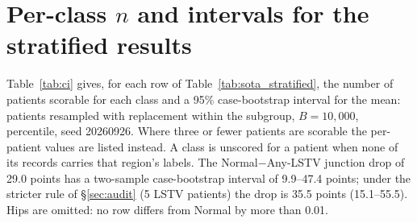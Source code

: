 \section{Per-class \texorpdfstring{$n$}{n} and intervals for the stratified results}
\label{app:ci}

Table~\ref{tab:ci} gives, for each row of
Table~\ref{tab:sota_stratified}, the number of patients
scorable for each class and a 95\% case-bootstrap interval
for the mean: patients resampled with replacement within
the subgroup, $B{=}10{,}000$, percentile, seed 20260926.
Where three or fewer patients are scorable the
per-patient values are listed instead. A class is
unscored for a patient when none of its records carries
that region's labels. The Normal$-$Any-LSTV junction drop of 29.0 points
has a two-sample case-bootstrap interval of 9.9--47.4
points; under the stricter rule of \S\ref{sec:audit} (5
LSTV patients) the drop is 35.5 points (15.1--55.5). Hips
are omitted: no row differs from Normal by more than 0.01.

